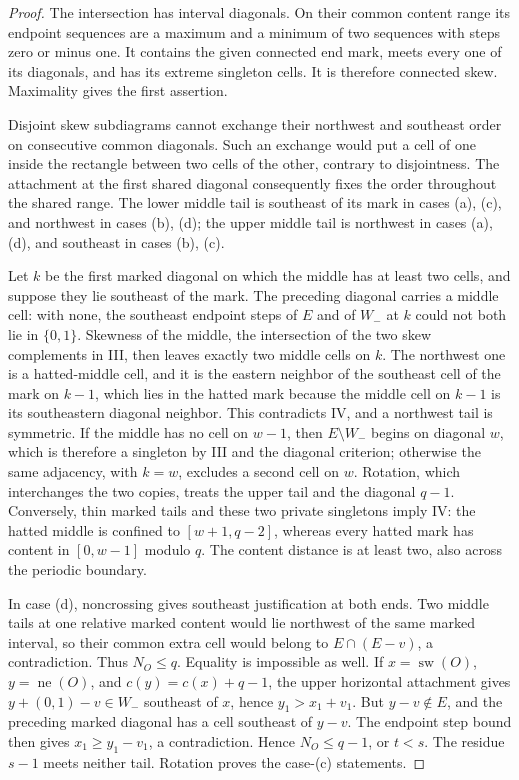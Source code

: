 \documentclass[11pt,a4paper]{amsart}
\numberwithin{equation}{section}
\theoremstyle{plain}
\theoremstyle{definition}
\begin{document}
\begin{proof}
The intersection has interval diagonals.  On their common content range its endpoint sequences are a maximum and a minimum of two sequences with steps zero or minus one.  It contains the given connected end mark, meets every one of its diagonals, and has its extreme singleton cells.  It is therefore connected skew.  Maximality gives the first assertion.

Disjoint skew subdiagrams cannot exchange their northwest and southeast order on consecutive common diagonals.  Such an exchange would put a cell of one inside the rectangle between two cells of the other, contrary to disjointness.  The attachment at the first shared diagonal consequently fixes the order throughout the shared range.  The lower middle tail is southeast of its mark in cases (a), (c), and northwest in cases (b), (d); the upper middle tail is northwest in cases (a), (d), and southeast in cases (b), (c).

Let \(k\) be the first marked diagonal on which the middle has at least two cells, and suppose they lie southeast of the mark.  The preceding diagonal carries a middle cell: with none, the southeast endpoint steps of \(E\) and of \(W_-\) at \(k\) could not both lie in \(\{0,1\}\).  Skewness of the middle, the intersection of the two skew complements in III, then leaves exactly two middle cells on \(k\).  The northwest one is a hatted-middle cell, and it is the eastern neighbor of the southeast cell of the mark on \(k-1\), which lies in the hatted mark because the middle cell on \(k-1\) is its southeastern diagonal neighbor.  This contradicts IV, and a northwest tail is symmetric.  If the middle has no cell on \(w-1\), then \(E\setminus W_-\) begins on diagonal \(w\), which is therefore a singleton by III and the diagonal criterion; otherwise the same adjacency, with \(k=w\), excludes a second cell on \(w\).  Rotation, which interchanges the two copies, treats the upper tail and the diagonal \(q-1\).  Conversely, thin marked tails and these two private singletons imply IV: the hatted middle is confined to \([w+1,q-2]\), whereas every hatted mark has content in \([0,w-1]\) modulo \(q\).  The content distance is at least two, also across the periodic boundary.

In case (d), noncrossing gives southeast justification at both ends.  Two middle tails at one relative marked content would lie northwest of the same marked interval, so their common extra cell would belong to \(E\cap(E-v)\), a contradiction.  Thus \(N_O\le q\).  Equality is impossible as well.  If \(x=\operatorname{sw}(O)\), \(y=\operatorname{ne}(O)\), and \(c(y)=c(x)+q-1\), the upper horizontal attachment gives \(y+(0,1)-v\in W_-\) southeast of \(x\), hence \(y_1>x_1+v_1\).  But \(y-v\notin E\), and the preceding marked diagonal has a cell southeast of \(y-v\).  The endpoint step bound then gives \(x_1\ge y_1-v_1\), a contradiction.  Hence \(N_O\le q-1\), or \(t<s\).  The residue \(s-1\) meets neither tail.  Rotation proves the case-(c) statements.


\end{proof}
\end{document}

